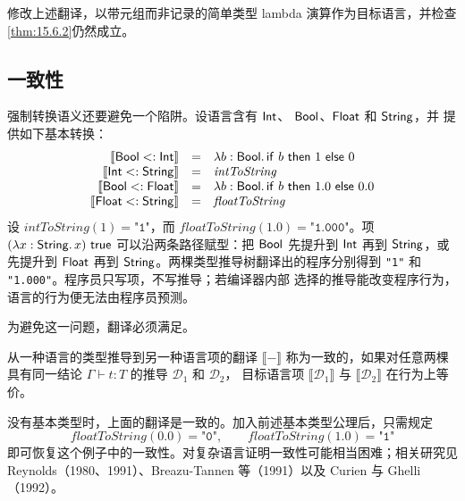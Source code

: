 \begin{exercise}[\(\star\star\star\), \(\nrightarrow\)]
\label{ex:15.6.3}
修改上述翻译，以带元组而非记录的简单类型 lambda 演算作为目标语言，并检查
\cref{thm:15.6.2}仍然成立。
\end{exercise}

\subsection*{一致性}

强制转换语义还要避免一个陷阱。设语言含有 \(\mathsf{Int}\)、
\(\mathsf{Bool}\)、\(\mathsf{Float}\) 和 \(\mathsf{String}\)，并
提供如下基本转换：
\[
\begin{array}{rcl}
\llbracket\mathsf{Bool}\mathrel{<:}\mathsf{Int}\rrbracket
 &=&\lambda b:\mathsf{Bool}.\,
     \mathsf{if}\ b\ \mathsf{then}\ 1\ \mathsf{else}\ 0\\
\llbracket\mathsf{Int}\mathrel{<:}\mathsf{String}\rrbracket
 &=&\mathit{intToString}\\
\llbracket\mathsf{Bool}\mathrel{<:}\mathsf{Float}\rrbracket
 &=&\lambda b:\mathsf{Bool}.\,
     \mathsf{if}\ b\ \mathsf{then}\ 1.0\ \mathsf{else}\ 0.0\\
\llbracket\mathsf{Float}\mathrel{<:}\mathsf{String}\rrbracket
 &=&\mathit{floatToString}
\end{array}
\]
设 \(\mathit{intToString}(1)=\texttt{"1"}\)，而
\(\mathit{floatToString}(1.0)=\texttt{"1.000"}\)。项
\((\lambda x:\tapltype{String}.\,x)\ \tapltrue\) 可以沿两条路径赋型：把
\(\mathsf{Bool}\) 先提升到 \(\mathsf{Int}\) 再到
\(\mathsf{String}\)，或先提升到 \(\mathsf{Float}\) 再到
\(\mathsf{String}\)。两棵类型推导树翻译出的程序分别得到
\texttt{"1"} 和 \texttt{"1.000"}。程序员只写项，不写推导；若编译器内部
选择的推导能改变程序行为，语言的行为便无法由程序员预测。

为避免这一问题，翻译必须满足。

\begin{definition}
\label{def:15.6.4}
从一种语言的类型推导到另一种语言项的翻译
\(\llbracket-\rrbracket\) 称为一致的，如果对任意两棵具有同一结论
\(\Gamma\vdash t:T\) 的推导 \(\mathcal D_1\) 和 \(\mathcal D_2\)，
目标语言项 \(\llbracket\mathcal D_1\rrbracket\) 与
\(\llbracket\mathcal D_2\rrbracket\) 在行为上等价。
\end{definition}

没有基本类型时，上面的翻译是一致的。加入前述基本类型公理后，只需规定
\[
\mathit{floatToString}(0.0)=\texttt{"0"},
\qquad
\mathit{floatToString}(1.0)=\texttt{"1"}
\]
即可恢复这个例子中的一致性。对复杂语言证明一致性可能相当困难；相关研究见
Reynolds（1980、1991）、Breazu-Tannen 等（1991）以及 Curien 与
Ghelli（1992）。


